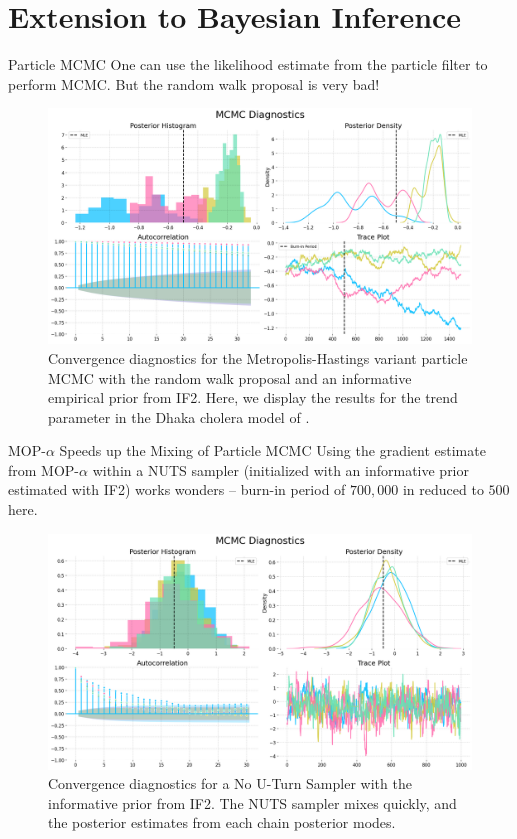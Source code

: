 \documentclass{beamer}
\begin{document}
\section{Extension to Bayesian Inference}

\begin{frame}{Particle MCMC}
    One can use the likelihood estimate from the particle filter to perform MCMC. But the random walk proposal is very bad!
    
\begin{figure}[t!]
    \centering
    \includegraphics[width = \textwidth/\real{1.5}]{imgs/pmcmc/mh.png}
    \caption{Convergence diagnostics for the Metropolis-Hastings variant particle MCMC with the random walk proposal and an informative empirical prior from IF2. Here, we display the results for the trend parameter in the Dhaka cholera model of \cite{king08}.}
    \label{fig:mh}
\end{figure}
\end{frame}

\begin{frame}{MOP-$\alpha$ Speeds up the Mixing of Particle MCMC}
    Using the gradient estimate from MOP-$\alpha$ within a NUTS sampler (initialized with an informative prior estimated with IF2) works wonders -- burn-in period of $700,000$ in \cite{fasiolo16} reduced to $500$ here.
    \begin{figure}[t!]
    \centering
    \includegraphics[width=\textwidth/\real{1.5}]{imgs/pmcmc/nuts_eb.png}
    \caption{Convergence diagnostics for a No U-Turn Sampler with the informative prior from IF2. The NUTS sampler mixes quickly, and the posterior estimates from each chain posterior modes.}
    \label{fig:nuts-eb}
\end{figure}

\end{frame}
\end{document}
